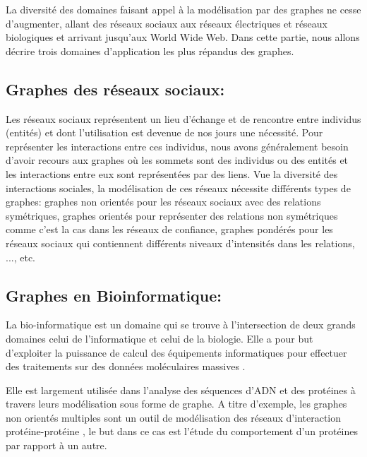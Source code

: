   La diversité des domaines faisant appel à la modélisation par des graphes ne cesse d'augmenter, allant des réseaux sociaux aux réseaux électriques et réseaux biologiques et arrivant jusqu'aux World Wide Web. Dans cette partie, nous allons décrire trois domaines d'application les plus répandus des graphes.
	
		\subsection{Graphes des réseaux sociaux:}
		Les réseaux sociaux représentent un lieu d'échange et de rencontre entre individus (entités) et dont l'utilisation est devenue de nos jours une nécessité.  
		Pour représenter les interactions entre ces individus, nous avons généralement besoin d'avoir recours aux graphes où les sommets sont des individus ou des entités et les interactions entre eux sont représentées par des liens. 
		Vue la diversité des interactions sociales, la modélisation de ces réseaux nécessite différents types de graphes: graphes non orientés pour les réseaux sociaux avec des relations  symétriques, graphes orientés pour représenter des relations non symétriques
comme c'est la cas dans les réseaux de confiance, graphes pondérés pour les réseaux sociaux qui contiennent différents niveaux d'intensités dans les relations, ..., etc. \citep{lemmouchi2012etude}
		
		\subsection{Graphes en Bioinformatique:}
		
		La bio-informatique est un domaine qui se trouve à l'intersection de deux grands domaines celui de l'informatique et celui de la biologie. Elle a pour but d'exploiter la puissance de calcul des équipements informatiques pour effectuer des traitements sur des données moléculaires massives \citep{pellegrini2004protein}.
		
		Elle est largement utilisée dans l’analyse des séquences d’ADN et des protéines à travers leurs modélisation sous forme de graphe. A titre d'exemple, les graphes non orientés multiples sont un outil de modélisation des réseaux d’interaction protéine-protéine \citep{pellegrini2004protein}, 
		le but dans ce cas est l'étude du comportement d'un protéines par rapport à un autre.
		
